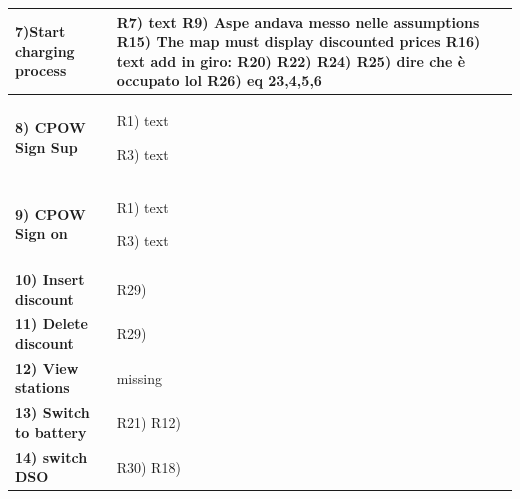 \documentclass[table, 12pt]{article} %
\begin{document}
\begin{itemize}
\begin{longtable}{|p{}|p{}|}
                    \cellcolor{SpringGreen!50}\textbf{7)Start charging process}\centering & R7) text
                                                                     R9) Aspe andava messo nelle assumptions
                                                                     R15) The map must display discounted prices
                                                                     R16) text add in giro:
                                                                     R20)
                                                                     R22)
                                                                     R24)
                                                                     R25) dire che è occupato lol
                                                                     R26)
                                                                     eq 23,4,5,6\\\hline



                      \cellcolor{SpringGreen!50}\textbf{8) CPOW Sign Sup}\centering & R1) text

                                                                     R3) text\\\hline
                    \cellcolor{SpringGreen!50}\textbf{9) CPOW Sign on}\centering & R1) text

                                                                     R3) text\\\hline

                    \cellcolor{SpringGreen!50}\textbf{10) Insert discount}\centering & R29)   \\\hline

                    \cellcolor{SpringGreen!50}\textbf{11) Delete discount}\centering & R29)  \\\hline

                    \cellcolor{SpringGreen!50}\textbf{12) View stations}\centering & missing  \\\hline

                    \cellcolor{SpringGreen!50}\textbf{13) Switch to battery}\centering & R21)
                                                                     R12)   \\\hline

                    \cellcolor{SpringGreen!50}\textbf{14) switch DSO}\centering & R30)
                                                                            R18)\\\hline





            \end{longtable}
    
    \end{itemize}
\end{document}

